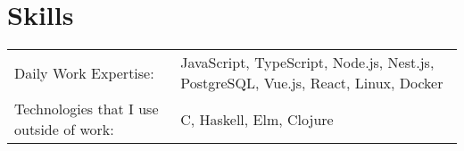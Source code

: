 \documentclass[a4paper,10pt]{article}
\begin{document}


\section{Skills}
\begin{tabularx}{\linewidth}{@{}l X@{}}
Daily Work Expertise: &  \normalsize{JavaScript, TypeScript, Node.js, Nest.js, PostgreSQL, Vue.js, React, Linux, Docker}\\
Technologies that I use outside of work:  &  \normalsize{C, Haskell, Elm, Clojure}\\  
\end{tabularx}

\vfill
{}
\end{document}
